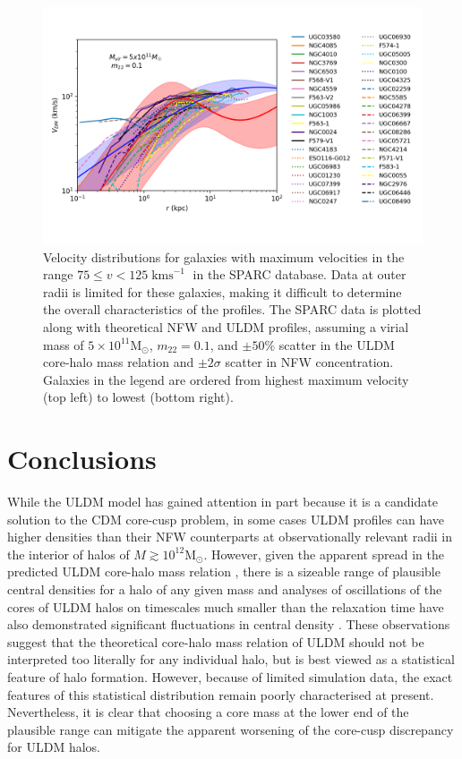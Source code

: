 \documentclass{pasa}%
\begin{document}
\begin{figure}[t]
\centering
\includegraphics[scale=0.9, trim={0.5cm 1cm 0cm 1cm}]{000_vs_SPARC_5_10_11.png}
\caption{Velocity distributions for galaxies with maximum velocities in the range $75 \leq v < 125\operatorname{kms}^{-1}$ in the SPARC database. Data at outer radii is limited for these galaxies, making it difficult to determine the overall characteristics of the profiles. The SPARC data is plotted along with theoretical NFW and ULDM profiles, assuming a virial mass of $5\times10^{11} \mathrm{M}_{\odot}$, $m_{22} = 0.1$, and $\pm 50 \%$ scatter in the ULDM core-halo mass relation and $\pm2\sigma$ scatter in NFW concentration. Galaxies in the legend are ordered from highest maximum velocity (top left) to lowest (bottom right).}\label{fig:low_v}
\end{figure}



\section{Conclusions}\label{sec:conclusion}

While the ULDM model has gained attention in part because it is a candidate solution to  the CDM core-cusp problem, in some cases ULDM profiles can have higher densities than their NFW counterparts at observationally relevant radii in the interior of halos of $M \gtrsim 10^{12} \mathrm{M}_{\odot}$. However, given the apparent spread in the predicted ULDM core-halo mass relation \cite{Schive:2014hza}, there is a sizeable range of plausible central densities for a halo of any given mass and analyses of oscillations of the cores of ULDM halos on timescales much smaller than the relaxation time have also demonstrated significant fluctuations in central density \cite{Veltmaat:2018dfz}. These observations suggest that the theoretical core-halo mass relation of ULDM should not be interpreted too literally for any individual halo, but is best viewed as a statistical feature of halo formation. However, because of limited simulation data, the exact features of this statistical distribution remain poorly characterised at present. Nevertheless, it is clear that choosing a core mass at the lower end of the plausible range can mitigate the apparent worsening of the core-cusp discrepancy for ULDM halos.  
\end{document}
